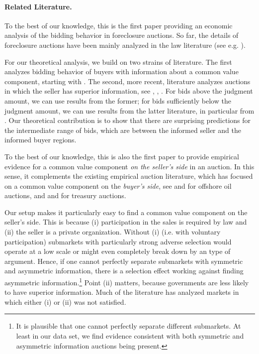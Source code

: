 \documentclass[11pt,twopage]{article}
\begin{document}
\paragraph{Related Literature.} To the best of our knowledge, this is
the first paper providing an economic analysis of the bidding behavior
in foreclosure auctions. So far, the details of foreclosure auctions
have been mainly analyzed in the law literature (see
e.g. \cite{nelson2004reforming}).

For our theoretical analysis, we build on two strains of
literature. The first analyzes bidding behavior of buyers with
information about a common value component, starting with
\cite{milgrom1982theory}. The second, more recent, literature analyzes
auctions in which the seller has superior information, see
\cite{jullien2006auction}, \cite{cai2007reserve}, \cite{lamy}. For
bids above the judgment amount, we can use results from the former;
for bids sufficiently below the judgment amount, we can use results
from the latter literature, in particular from
\cite{cai2007reserve}. Our theoretical contribution is to show that
there are surprising predictions for the intermediate range of bids,
which are between the informed seller and the informed buyer regions.

To the best of our knowledge, this is also the first paper to provide
empirical evidence for a common value component \emph{on the seller's
  side} in an auction. In this sense, it complements the existing
empirical auction literature, which has focused on a common value
component on the \emph{buyer's side}, see
\cite{hendricks1988empirical} and \cite{hendricks2003empirical} for
offshore oil auctions, and \cite{nyborg2002bidder} and
\cite{hortaccsu2012valuing} for treasury auctions.

Our setup makes it particularly easy to find a common value component
on the seller's side. This is because (i) participation in the sales
is required by law and (ii) the seller is a private
organization. Without (i) (i.e. with voluntary participation)
submarkets with particularly strong adverse selection would operate at
a low scale or might even completely break down by an
\cite{akerlof1970market} type of argument. Hence, if one cannot
perfectly separate submarkets with symmetric and asymmetric
information, there is a selection effect working against finding
asymmetric information.\footnote{It is plausible that one cannot
  perfectly separate different submarkets. At least in our data set,
  we find evidence consistent with both symmetric and asymmetric
  information auctions being present.} Point (ii) matters, because
governments are less likely to have superior information. Much of the
literature has analyzed markets in which either (i) or (ii) was not
satisfied.
\end{document}
